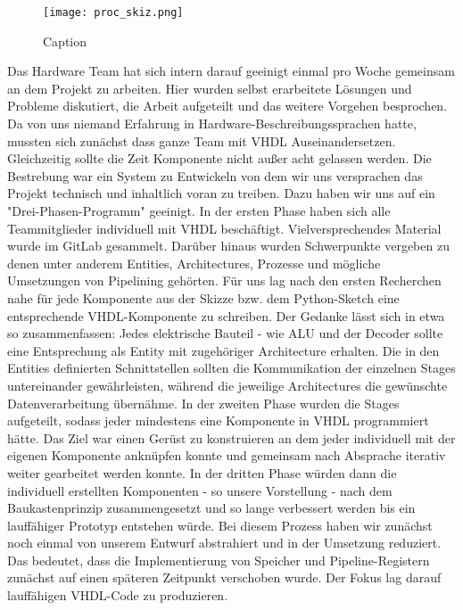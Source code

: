\documentclass[paper=a4,fontsize=12pt,twocolumn]{scrreprt}
\begin{document}
\begin{figure}
    \centering
    \texttt{[image: proc\_skiz.png]}
    \caption{Caption}
    \label{fig:my_label}
\end{figure}


Das Hardware Team hat sich intern darauf geeinigt einmal pro Woche gemeinsam an dem Projekt zu arbeiten. 
Hier wurden selbst erarbeitete Lösungen und Probleme diskutiert, die Arbeit aufgeteilt und das weitere Vorgehen besprochen.
Da von uns niemand Erfahrung in Hardware-Beschreibungssprachen hatte, mussten sich zunächst dass ganze Team mit VHDL Auseinandersetzen.
Gleichzeitig sollte die Zeit Komponente nicht außer acht gelassen werden.
Die Bestrebung war ein System zu Entwickeln von dem wir uns versprachen das Projekt technisch und inhaltlich voran zu treiben.
Dazu haben wir uns auf ein "Drei-Phasen-Programm" geeinigt. In der ersten Phase haben sich alle Teammitglieder individuell mit VHDL beschäftigt.
Vielversprechendes Material wurde im GitLab gesammelt.
Darüber hinaus wurden Schwerpunkte vergeben zu denen unter anderem Entities, Architectures, Prozesse und mögliche Umsetzungen von Pipelining gehörten.
Für uns lag nach den ersten Recherchen nahe für jede Komponente aus der Skizze bzw. dem Python-Sketch eine entsprechende VHDL-Komponente zu schreiben.
Der Gedanke lässt sich in etwa so zusammenfassen: Jedes elektrische Bauteil - wie ALU und der Decoder sollte eine Entsprechung als Entity mit zugehöriger Architecture erhalten.
Die in den Entities definierten Schnittstellen sollten die Kommunikation der einzelnen Stages untereinander gewährleisten, während die jeweilige Architectures die gewünschte Datenverarbeitung übernähme.
In der zweiten Phase wurden die Stages aufgeteilt, sodass jeder mindestens eine Komponente in VHDL programmiert hätte.
Das Ziel war einen Gerüst zu konstruieren an dem jeder individuell mit der eigenen Komponente anknüpfen konnte und gemeinsam nach Absprache iterativ weiter gearbeitet werden konnte.
In der dritten Phase würden dann die individuell erstellten Komponenten - so unsere Vorstellung - nach dem Baukastenprinzip zusammengesetzt und so lange verbessert werden bis ein lauffähiger Prototyp entstehen würde.
Bei diesem Prozess haben wir zunächst noch einmal von unserem Entwurf abstrahiert und in der Umsetzung reduziert.
Das bedeutet, dass die Implementierung von Speicher und Pipeline-Registern zunächst auf einen späteren Zeitpunkt verschoben wurde.
Der Fokus lag darauf lauffähigen VHDL-Code zu produzieren.
\end{document}
